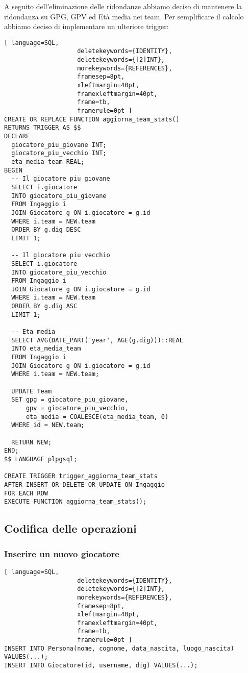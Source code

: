 \documentclass{article}
\begin{document}
A seguito dell'eliminazione delle ridondanze abbiamo deciso di mantenere la ridondanza su GPG, GPV ed Età media nei team. Per semplificare il calcolo abbiamo deciso di implementare un ulteriore trigger:
\begin{lstlisting}[ language=SQL,
                    deletekeywords={IDENTITY},
                    deletekeywords={[2]INT},
                    morekeywords={REFERENCES},
                    framesep=8pt,
                    xleftmargin=40pt,
                    framexleftmargin=40pt,
                    frame=tb,
                    framerule=0pt ]
CREATE OR REPLACE FUNCTION aggiorna_team_stats()
RETURNS TRIGGER AS $$
DECLARE
  giocatore_piu_giovane INT;
  giocatore_piu_vecchio INT;
  eta_media_team REAL;
BEGIN
  -- Il giocatore piu giovane
  SELECT i.giocatore
  INTO giocatore_piu_giovane
  FROM Ingaggio i
  JOIN Giocatore g ON i.giocatore = g.id
  WHERE i.team = NEW.team
  ORDER BY g.dig DESC
  LIMIT 1;

  -- Il giocatore piu vecchio
  SELECT i.giocatore
  INTO giocatore_piu_vecchio
  FROM Ingaggio i
  JOIN Giocatore g ON i.giocatore = g.id
  WHERE i.team = NEW.team
  ORDER BY g.dig ASC
  LIMIT 1;

  -- Eta media
  SELECT AVG(DATE_PART('year', AGE(g.dig)))::REAL
  INTO eta_media_team
  FROM Ingaggio i
  JOIN Giocatore g ON i.giocatore = g.id
  WHERE i.team = NEW.team;

  UPDATE Team
  SET gpg = giocatore_piu_giovane,
      gpv = giocatore_piu_vecchio,
      eta_media = COALESCE(eta_media_team, 0)
  WHERE id = NEW.team;

  RETURN NEW;
END;
$$ LANGUAGE plpgsql;

CREATE TRIGGER trigger_aggiorna_team_stats
AFTER INSERT OR DELETE OR UPDATE ON Ingaggio
FOR EACH ROW
EXECUTE FUNCTION aggiorna_team_stats();
\end{lstlisting}

\subsection{Codifica delle operazioni}

\subsubsection{Inserire un nuovo giocatore}
\begin{lstlisting}[ language=SQL,
                    deletekeywords={IDENTITY},
                    deletekeywords={[2]INT},
                    morekeywords={REFERENCES},
                    framesep=8pt,
                    xleftmargin=40pt,
                    framexleftmargin=40pt,
                    frame=tb,
                    framerule=0pt ]
INSERT INTO Persona(nome, cognome, data_nascita, luogo_nascita) VALUES(...);
INSERT INTO Giocatore(id, username, dig) VALUES(...);
\end{lstlisting}
\end{document}
